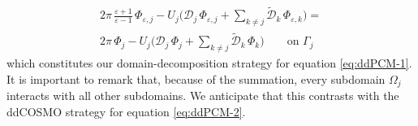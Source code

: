 \begin{multline}\label{eq:1}
2\pi \, \frac{\varepsilon + 1}{\varepsilon - 1} \, \Phi_{\varepsilon,j} - U_j \bigg( {\mathcal{D}}_j \, \Phi_{\varepsilon,j} + \sum_{k \ne j} \tilde{\mathcal{D}}_{k} \, \Phi_{\varepsilon,k}  \bigg) = \\ 2 \pi \, {\Phi_j} - U_j \bigg( {\mathcal{D}}_j \,\Phi_{j} + \sum_{k \ne j} \tilde{\mathcal{D}}_{k} \, \Phi_{k}  \bigg) \qquad \text{on }\Gamma_j
\end{multline}
which constitutes our domain-decomposition strategy for equation \eqref{eq:ddPCM-1}. It is important to remark that, because of the summation, every subdomain $\Omega_j$ interacts with all other subdomains. We anticipate that this contrasts with the ddCOSMO strategy for equation \eqref{eq:ddPCM-2}.


